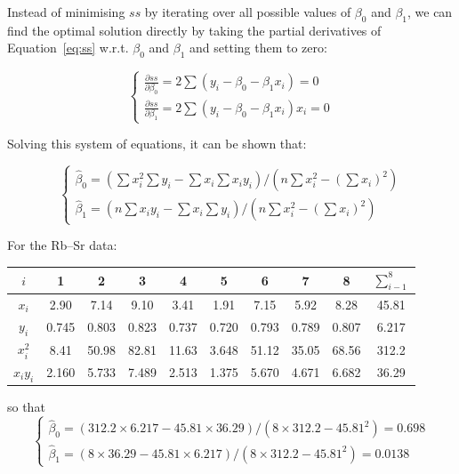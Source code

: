 Instead of minimising $ss$ by iterating over all possible values of
$\beta_0$ and $\beta_1$, we can find the optimal solution directly by
taking the partial derivatives of Equation~\ref{eq:ss}
w.r.t. $\beta_0$ and $\beta_1$ and setting them to zero:

\begin{equation}
\begin{cases}
    \frac{\partial ss}{\partial\beta_0} = 2 \sum(y_i - \beta_0 - \beta_1 x_i) = 0\\
    \frac{\partial ss}{\partial\beta_1} = 2 \sum(y_i - \beta_0 - \beta_1 x_i) x_i = 0
\end{cases}
\end{equation}

Solving this system of equations, it can be shown that:

\begin{equation}
\begin{cases}
  \hat{\beta}_0 = \left(\sum x_i^2 \sum y_i - \sum x_i \sum x_iy_i\right) /
  \left(n \sum x_i^2 - \left(\sum x_i\right)^2\right)\\
  \hat{\beta}_1 = \left(n\sum x_iy_i - \sum x_i \sum y_i \right) /
  \left(n \sum x_i^2 - \left(\sum x_i\right)^2\right)
\end{cases}
\label{eq:fitab}
\end{equation}

For the Rb--Sr data:

\begin{center}
  \begin{tabular}{c|cccccccc|c}
    $i$ & 1 & 2 & 3 & 4 & 5 & 6 & 7 & 8 & $\sum_{i-1}^{8}$ \\ \hline
    $x_i$ & 2.90 & 7.14 & 9.10 & 3.41 & 1.91 & 7.15 & 5.92 & 8.28 & 45.81 \\
    $y_i$ & 0.745 & 0.803 & 0.823 & 0.737 & 0.720 &
    0.793 & 0.789 & 0.807 & 6.217\\ \hline
    $x_i^2$ & 8.41 & 50.98 & 82.81 & 11.63 & 3.648 &
    51.12 & 35.05 & 68.56 & 312.2 \\
    $x_iy_i$ & 2.160 & 5.733 & 7.489 & 2.513 & 1.375 &
    5.670 & 4.671 & 6.682 & 36.29
  \end{tabular}
\end{center}

\noindent so that
\begin{equation*}
\begin{cases}
  \hat{\beta}_0 = \left(312.2 \times 6.217 - 45.81 \times 36.29 \right) /
  \left(8 \times 312.2 - 45.81^2\right) = 0.698 \\
  \hat{\beta}_1 = \left( 8 \times 36.29 - 45.81 \times 6.217 \right) /
  \left(8 \times 312.2 - 45.81^2\right) = 0.0138
\end{cases}
\end{equation*}

